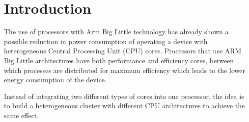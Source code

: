 






\section{Introduction}


The use of processors with Arm Big Little technology has already shown a possible reduction in power consumption of operating a device with heterogeneous Central Processing Unit (CPU) cores.
Processors that use ARM Big Little architectures have both performance and efficiency cores, 
between which processes are distributed for maximum efficiency
which leads to the lower energy consumption of the device.

Instead of integrating two different types of cores into one processor, the idea is to build a heterogeneous cluster with different CPU architectures to achieve the same effect.





 



